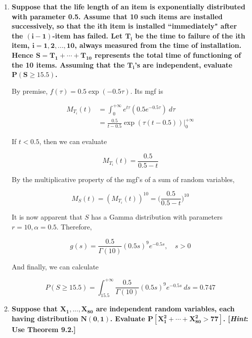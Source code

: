 \documentclass[10pt, oneside]{article}
\begin{document}
\begin{enumerate}[label=10.\arabic*]
And we calculate, for $m = 10$ grams,

\[ P(K \leq 3) = \int^3_0 \frac{1}{4m \sqrt{\pi}} \bigg( \frac{k}{4m} \bigg)^{-1/2} e^{-k/4m} \ dk = \boxed{0.30} \]

\item  \begin{tcolorbox}[
  colback=Cerulean!5!white,
  colframe=Cerulean!75!black]
\textbf{Suppose that the life length of an item is exponentially distributed with parameter 0.5. Assume that 10 such items are installed successively, so that the $\bm{i}$th item is installed ``immediately" after the $\bm{(i-1)}$-item has failed. Let $\bm{T_i}$ be the time to failure of the $\bm{i}$th item, $\bm{i = 1, 2, ..., 10}$, always measured from the time of installation. Hence $\bm{S = T_1 + \cdots + T_{10}}$ represents the total time of functioning of the 10 items. Assuming that the $\bm{T_i}$'s are independent, evaluate $\bm{P(S \geq 15.5)}$.}
\end{tcolorbox}

By premise, $f(\tau) = 0.5 \exp (-0.5 \tau)$. Its mgf is

\begin{align*}
M_{T_i}(t) &= \int^{+\infty}_0 e^{t\tau} (0.5 e^{-0.5 \tau}) \ d\tau \\
&= \frac{0.5}{t - 0.5} \exp(\tau(t-0.5)) \bigg|^{+\infty}_0
\end{align*}

If $t < 0.5$, then we can evaluate

\[ M_{T_i} (t) = \frac{0.5}{0.5-t} \]

By the multiplicative property of the mgf's of a sum of random variables,

\[ M_S(t) = (M_{T_i}(t))^{10} = \bigg( \frac{0.5}{0.5-t} \bigg)^{10} \]

It is now apparent that $S$ has a Gamma distribution with parameters $r=10, \alpha = 0.5$. Therefore,

\[ g(s) = \frac{0.5}{\Gamma(10)} (0.5 s)^9 e^{-0.5s}, \quad s > 0 \]

And finally, we can calculate

\[ P(S \geq 15.5) = \int^{+\infty}_{15.5} \frac{0.5}{\Gamma(10)} (0.5 s)^9 e^{-0.5s} \ ds = \boxed{0.747} \]

\item  \begin{tcolorbox}[
  colback=Cerulean!5!white,
  colframe=Cerulean!75!black]
\textbf{Suppose that $\bm{X_1, ..., X_{80}}$ are independent random variables, each having distribution $\bm{N(0,1)}$. Evaluate $\bm{P[X^2_1 + \cdots + X^2_{80} > 77]}$. [\textit{Hint}: Use Theorem 9.2.]}
\end{tcolorbox}


\end{enumerate}
\end{document}
